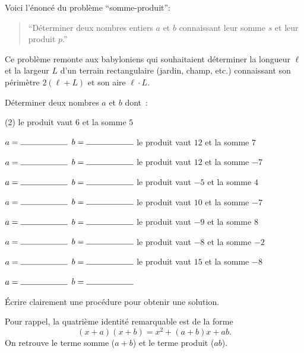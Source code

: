 \documentclass[a4paper,12pt]{report}
\begin{document}
\vspace*{-2\baselineskip}

Voici l'énoncé du problème \enquote{somme-produit}:
\begin{quote}
\enquote{Déterminer deux nombres entiers $a$ et $b$ connaissant leur somme $s$ et leur produit $p$.} 
\end{quote}
Ce problème remonte aux babyloniens qui souhaitaient déterminer la longueur $\ell$ et la largeur $L$ d'un terrain rectangulaire (jardin, champ, etc.) connaissant son périmètre $2(\ell+L)$ et son aire $\ell\cdot L$. 

\begin{exo}
Déterminer deux nombres $a$ et $b$ dont~:
	\begin{tasks}(2)
\task le produit vaut $6$ et la somme $5$

\vspace{15pt}
$a=\ligne{2}$ $b=\ligne{2}$
\task le produit vaut $12$ et la somme $7$

\vspace{15pt}
$a=\ligne{2}$ $b=\ligne{2}$
\task le produit vaut $12$ et la somme $-7$

\vspace{15pt}
$a=\ligne{2}$ $b=\ligne{2}$
\task le produit vaut $-5$ et la somme $4$

\vspace{15pt}
$a=\ligne{2}$ $b=\ligne{2}$
\task le produit vaut $10$ et la somme $-7$

\vspace{15pt}
$a=\ligne{2}$ $b=\ligne{2}$
\task le produit vaut $-9$ et la somme $8$

\vspace{15pt}
$a=\ligne{2}$ $b=\ligne{2}$
\task le produit vaut $-8$ et la somme $-2$

\vspace{15pt}
$a=\ligne{2}$ $b=\ligne{2}$
\task le produit vaut $15$ et la somme $-8$

\vspace{15pt}
$a=\ligne{2}$ $b=\ligne{2}$
\end{tasks}
\end{exo}

\begin{exo}
	Écrire clairement une procédure pour obtenir une solution.  

	\vspace{15pt}
	\myrulefill
	\vspace{15pt}

	\myrulefill
	\vspace{15pt}

	\myrulefill
	\vspace{15pt}

	\myrulefill
	\vspace{15pt}
\end{exo}
Pour rappel, la quatrième identité remarquable est de la forme
\[(x+a)(x+b)=x^2+(a+b)x+ab.\]
On retrouve le terme somme ($a+b$) et le terme produit ($ab$).
\end{document}

